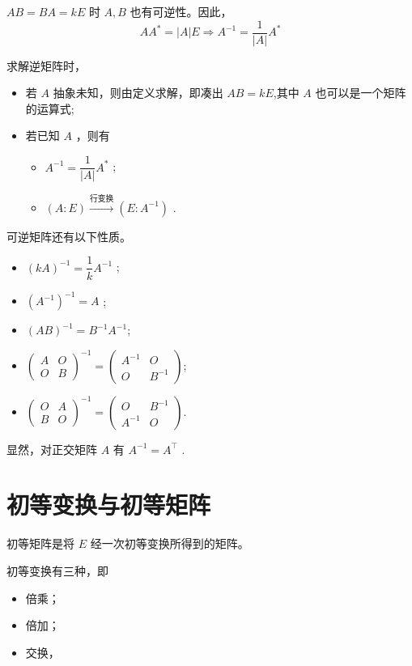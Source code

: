 $ AB = BA = kE $ 时 $ A,B $ 也有可逆性。因此，
$$
    AA^* = |A|E \Rightarrow 
    A^{-1} = \dfrac{1}{|A|} A^*
$$ 

求解逆矩阵时，
\begin{itemize}
    \item 若 $ A $ 抽象未知，则由定义求解，即凑出 $ AB = kE $,其中
    $ A $ 也可以是一个矩阵的运算式;
    \item 若已知 $ A $ ，则有
    \begin{itemize}
        \item $ A^{-1} = \dfrac{1}{|A|} A^* $ ;
        \item $ (A:E)\xrightarrow{\textrm{行变换}}(E:A^{-1}) $ .
    \end{itemize}
\end{itemize}

可逆矩阵还有以下性质。
\begin{itemize}
    \item $ (kA)^{-1} = \dfrac{1}{k}A^{-1} $ ;
    \item $ (A^{-1})^{-1} = A $ ;
    \item $ (AB)^{-1} = B^{-1}A^{-1} $;
    \item $ \begin{pmatrix}
        A&O\\O&B
    \end{pmatrix}^{-1} = \begin{pmatrix}
        A^{-1}&O\\O&B^{-1}
    \end{pmatrix} $;
    \item $ \begin{pmatrix}
        O&A\\B&O
    \end{pmatrix}^{-1} = \begin{pmatrix}
        O&B^{-1}\\A^{-1}&O
    \end{pmatrix} $.
\end{itemize}

显然，对正交矩阵 $ A $ 有 $ A^{-1} = A^\top $ .

\section{初等变换与初等矩阵}

初等矩阵是将 $ E $ 经一次初等变换所得到的矩阵。

初等变换有三种，即
\begin{itemize}
    \item 倍乘；
    \item 倍加；
    \item 交换，
\end{itemize}

